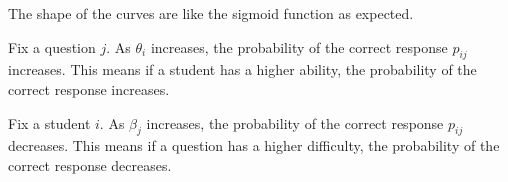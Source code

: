 \documentclass{article}
\begin{document}
\begin{enumerate}[label=(\alph*)]
    The shape of the curves are like the sigmoid function as expected.
    
    Fix a question $j$. As $\theta_i$ increases, the probability of the correct response $p_{ij}$ increases. This means if a student has a higher ability, the probability of the correct response increases.

    Fix a student $i$. As $\beta_j$ increases, the probability of the correct response $p_{ij}$ decreases. This means if a question has a higher difficulty, the probability of the correct response decreases.
\end{enumerate}
\end{document}
